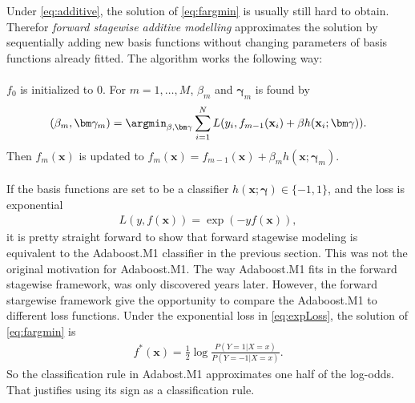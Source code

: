 Under \eqref{eq:additive}, the solution of \eqref{eq:fargmin} is usually still hard to obtain. Therefor \textit{forward stagewise additive modelling} approximates the solution by sequentially adding new basis functions without changing parameters of basis functions already fitted. The algorithm works the following way:\\
\\
$f_0$ is initialized to 0. For $m = 1, \ldots, M$, $\beta_m$ and $\bm \gamma_m$ is found by
\begin{align}
  \label{eq:forStageWise} 
  (\beta_m, \bm \gamma_m) = \argmin_{\beta, \bm \gamma} \sum^{N}_{i=1} L(y_i, f_{m-1}(\mathbf{x}_i) + \beta h(\mathbf{x}_i; \bm \gamma)).
\end{align}
Then $f_m(\mathbf{x})$ is updated to $f_m(\mathbf{x}) = f_{m-1}(\mathbf{x}) + \beta_m h(\mathbf{x}; \bm \gamma_m)$.\\
\\
If the basis functions are set to be a classifier $h(\mathbf{x}; \bm \gamma) \in \{-1, 1\}$, and the loss is exponential
\begin{align}
  \label{eq:expLoss} 
  L(y, f(\mathbf{x})) = \exp (-y f(\mathbf{x})),
\end{align}
it is pretty straight forward to show \cite{modstat} that forward stagewise modeling is equivalent to the Adaboost.M1 classifier in the previous section. This was not the original motivation for Adaboost.M1. The way Adaboost.M1 fits in the forward stagewise framework, was only discovered years later. However, the forward stargewise framework give the opportunity to compare the Adaboost.M1 to different loss functions. Under the exponential loss in \eqref{eq:expLoss}, the solution of \eqref{eq:fargmin} is 
\begin{align}
  f^*( \mathbf{x}) = \frac{1}{2} \log \frac{P(Y=1 |X=x)}{P(Y=-1 | X = x)} .
\end{align}
So the classification rule in Adabost.M1 approximates one half of the log-odds. That justifies using its sign as a classification rule.
%
